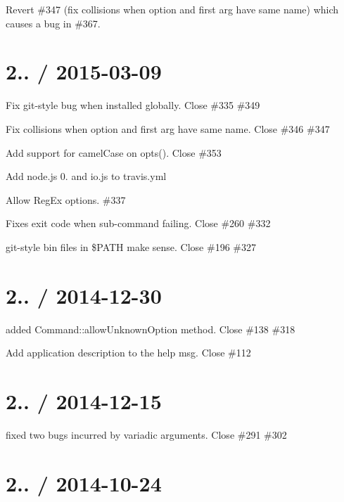 \begin{DoxyItemize}
\item Revert \#347 (fix collisions when option and first arg have same name) which causes a bug in \#367.
\end{DoxyItemize}

\section*{2.. / 2015-\/03-\/09 }


\begin{DoxyItemize}
\item Fix git-\/style bug when installed globally. Close \#335 \#349 
\item Fix collisions when option and first arg have same name. Close \#346 \#347 
\item Add support for camel\+Case on {\ttfamily opts()}. Close \#353 
\item Add node.\+js 0. and io.\+js to travis.\+yml
\item Allow Reg\+Ex options. \#337 
\item Fixes exit code when sub-\/command failing. Close \#260 \#332 
\item git-\/style {\ttfamily bin} files in \$\+P\+A\+TH make sense. Close \#196 \#327 
\end{DoxyItemize}

\section*{2.. / 2014-\/12-\/30 }


\begin{DoxyItemize}
\item added {\ttfamily Command\+::allow\+Unknown\+Option} method. Close \#138 \#318  
\item Add application description to the help msg. Close \#112 
\end{DoxyItemize}

\section*{2.. / 2014-\/12-\/15 }


\begin{DoxyItemize}
\item fixed two bugs incurred by variadic arguments. Close \#291  \#302 
\end{DoxyItemize}

\section*{2.. / 2014-\/10-\/24 }


